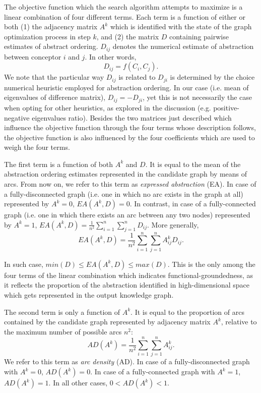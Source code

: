 The objective function which the search algorithm attempts to maximize is a linear combination of four different terms. Each term is a function of either or both (1) the adjacency matrix $A^k$ which is identified with the state of the graph optimization process in step $k$, and (2) the matrix $D$ containing pairwise estimates of abstract ordering. $D_{ij}$ denotes the numerical estimate of abstraction between conceptor $i$ and $j$. In other words, $$D_{ij} = f(C_i, C_j).$$ We note that the particular way $D_{ij}$ is related to $D_{ji}$ is determined by the choice numerical heuristic employed for abstraction ordering. In our case (i.e. mean of eigenvalues of difference matrix), $D_{ij} = -D_{ji}$, yet this is not necessarily the case when opting for other heuristics, as explored in the discussion (e.g. positive-negative eigenvalues ratio). Besides the two matrices just described which influence the objective function through the four terms whose description follows, the objective function is also influenced by the four coefficients which are used to weigh the four terms.

The first term is a function of both $A^k$ and $D$. It is equal to the mean of the abstraction ordering estimates represented in the candidate graph by means of arcs. From now on, we refer to this term as \textit{expressed abstraction} (EA). In case of a fully-disconnected graph (i.e. one in which no arc exists in the graph at all) represented by $A^k = 0$, $EA(A^k, D) = 0$. In contrast, in case of a fully-connected graph (i.e. one in which there exists an arc between any two nodes) represented by $A^k = 1$, $EA(A^k, D) = \frac{1}{n^2} \sum_{i=1}^{n} \sum_{j=1}^{n} D_{ij}.$ More generally, $$EA(A^k, D) = \frac{1}{n^2} \sum_{i=1}^{n} \sum_{j=1}^{n} A^k_{ij}D_{ij}.$$

In such case, $min(D) \leq EA(A^k, D) \leq max(D)$. This is the only among the four terms of the linear combination which indicates functional-groundedness, as it reflects the proportion of the abstraction identified in high-dimensional space which gets represented in the output knowledge graph.

The second term is only a function of $A^k$. It is equal to the proportion of arcs contained by the candidate graph represented by adjacency matrix $A^k$, relative to the maximum number of possible arcs $n^2$: $$AD(A^k) = \frac{1}{n^2} \sum_{i=1}^{n} \sum_{j=1}^{n} A^k_{ij}.$$ We refer to this term as \textit{arc density} (AD). In case of a fully-disconnected graph with $A^k = 0$, $AD(A^k) = 0$. In case of a fully-connected graph with $A^k = 1$, $AD(A^k) = 1$. In all other cases, $0 < AD(A^k) < 1$.


